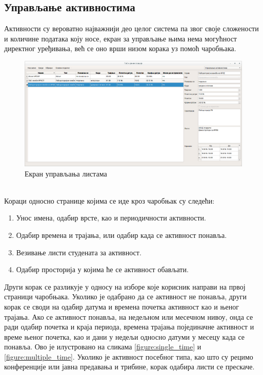 \documentclass[a4paper, 12pt, diplomski]{etfcyr}
\begin{document}
			\newpage

			\subsection{Управљање активностима}
				\begin{justify}
					Активности су вероватно најважнији део целог система па звог своје сложености и количине података коју носе, екран за управљање њима нема могућност директног уређивања, већ се оно врши низом корака уз помоћ чаробњака.
					\begin{figure}[h]
						\begin{center}
							\includegraphics[width=1.0\textwidth]{manual/activities_main_window.png}
						\end{center}
						\caption{Екран управљања листама}
						\label{figure:activities_main_window}
					\end{figure}\\
					\noindent
					Кораци односно странице којима се иде кроз чаробњак су следећи:
					\begin{enumerate}[noitemsep]
						\item Унос имена, одабир врсте, као и периодичности активности.
						\item Одабир времена и трајања, или одабир када се активност понавља.
						\item Везивање листи студената за активност.
						\item Одабир просторија у којима ће се активност обављати.
					\end{enumerate}
					Други корак се разликује у односу на изборе које корисник направи на првој страници чаробњака. Уколико је одабрано да се активност не понавља, други корак се своди на одабир датума и времена почетка активност као и њеног трајања. Ако се активност понавља, на недељном или месечном нивоу, онда се ради одабир почетка и краја периода, времена трајања појединачне активност и време њеног почетка, као и дани у недељи односно датуми у месецу када се понавља. Ово је илустровано на сликама \ref{figure:single_time} и \ref{figure:multiple_time}.
					Уколико је активност посебног типа, као што су рецимо конференције или јавна предавања и трибине, корак одабира листи се прескаче.


\end{justify}
\end{document}
